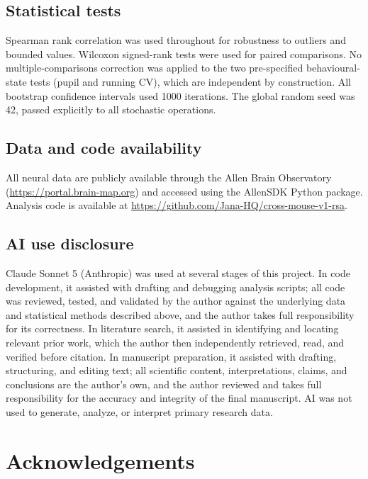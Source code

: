 \documentclass[11pt,onecolumn]{article}
\begin{document}
\subsection{Statistical tests}

Spearman rank correlation was used throughout for robustness to outliers
and bounded values. Wilcoxon signed-rank tests were used for paired
comparisons. No multiple-comparisons correction was applied to the two
pre-specified behavioural-state tests (pupil and running CV), which are
independent by construction. All bootstrap confidence intervals used 1000
iterations. The global random seed was 42, passed explicitly to all
stochastic operations.

\subsection{Data and code availability}

All neural data are publicly available through the Allen Brain Observatory
(\url{https://portal.brain-map.org}) and accessed using the AllenSDK
Python package. Analysis code is available at
\url{https://github.com/Jana-HQ/cross-mouse-v1-rsa}.

\subsection{AI use disclosure}

Claude Sonnet 5 (Anthropic) was used at several stages of this project.
In code development, it assisted with drafting and debugging analysis
scripts; all code was reviewed, tested, and validated by the author
against the underlying data and statistical methods described above, and
the author takes full responsibility for its correctness. In literature
search, it assisted in identifying and locating relevant prior work,
which the author then independently retrieved, read, and verified before
citation. In manuscript preparation, it assisted with drafting,
structuring, and editing text; all scientific content, interpretations,
claims, and conclusions are the author's own, and the author reviewed and
takes full responsibility for the accuracy and integrity of the final
manuscript. AI was not used to generate, analyze, or interpret primary
research data.

\section*{Acknowledgements}
\end{document}
